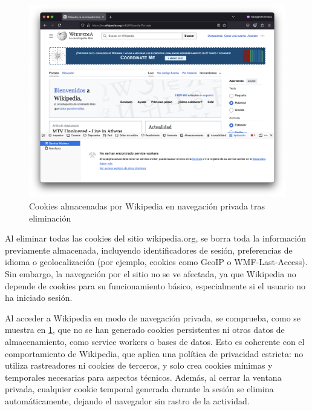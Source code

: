\begin{figure}[H]   
    \includegraphics[width=\textwidth]{cookies_wiki_npriv.png}
    \caption{Cookies almacenadas por Wikipedia en navegación privada tras eliminación}
    \label{fig:cookies_wiki_npriv}
\end{figure}

Al eliminar todas las cookies del sitio wikipedia.org, se borra toda la información previamente almacenada, incluyendo identificadores de sesión, preferencias de idioma o geolocalización (por ejemplo, cookies como GeoIP o WMF-Last-Access). Sin embargo, la navegación por el sitio no se ve afectada, ya que Wikipedia no depende de cookies para su funcionamiento básico, especialmente si el usuario no ha iniciado sesión. 

Al acceder a Wikipedia en modo de navegación privada, se comprueba, como se muestra en \ref{fig:cookies_wiki_npriv}, que no se han generado cookies persistentes ni otros datos de almacenamiento, como service workers o bases de datos. Esto es coherente con el comportamiento de Wikipedia, que aplica una política de privacidad estricta: no utiliza rastreadores ni cookies de terceros, y solo crea cookies mínimas y temporales necesarias para aspectos técnicos. Además, al cerrar la ventana privada, cualquier cookie temporal generada durante la sesión se elimina automáticamente, dejando el navegador sin rastro de la actividad. 

